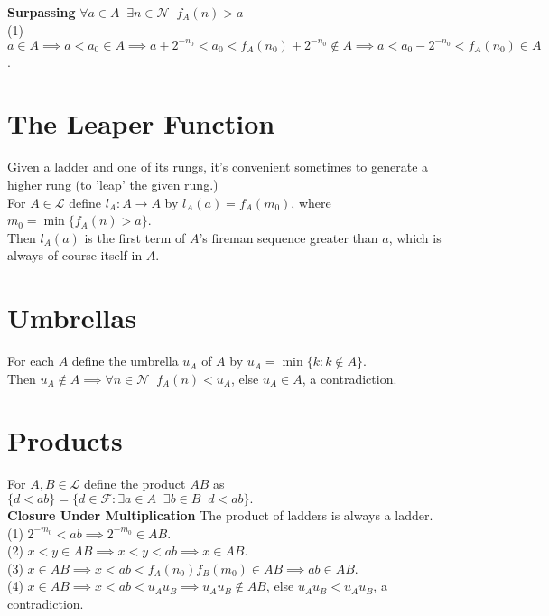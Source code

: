\documentclass[10pt]{article}
\newcommand{\ladders}{ \mathscr{L}}
\newcommand{\dyadics}{ \mathscr{F}}
\newcommand{\naturals}{ \mathscr{N}}
\newcommand{\leaper}{l}
\newcommand{\climber}{ f}
\begin{document}
\textbf{Surpassing} \;\;  $\forall a \in A \;\; \exists n \in \naturals \;\; \climber_A(n) > a$\\

(1) $a \in A\implies a < a_0 \in A \implies a + 2^{-n_0}  < a_0  < f_A(n_0) + 2^{-n_0} \notin A \implies a < a_0  - 2^{-n_0} < f_A(n_0) \in A $.\\
\bigbreak
\bigbreak
\bigbreak
\bigbreak
\bigbreak
\bigbreak
\bigbreak
\bigbreak
\bigbreak
\bigbreak
\bigbreak
\bigbreak
\bigbreak
\bigbreak
\bigbreak
\bigbreak
\bigbreak

\section{The Leaper Function}
Given a ladder and one of its rungs, it's convenient sometimes to generate a higher rung (to 'leap' the given rung.)\\

For $A \in \ladders$ define $\leaper_A : A \to A$ by $\leaper_A(a) = f_A(m_0)$, where $m_0 = \min\{f_A(n) > a \}$.\\

Then $\leaper_A(a)$ is the first term of $A$'s fireman sequence greater than $a$, which is always of course itself in $A$.

\section{Umbrellas}
For each $A$ define the umbrella $u_A$ of $A$ by $u_A= \min \{ k : k \notin A \}.$\\ 

Then $u_A \notin A \implies \forall n \in \naturals \;\; f_A(n) < u_A$, else $u_A \in A$, a contradiction.

\section{Products}

For $A, B \in \ladders$ define the product $AB$ as $\{d < ab\} = \{ d \in \dyadics : \exists a \in A \;\; \exists b \in B \;\; d < ab \}.$\\

\textbf{Closure Under Multiplication} The product of ladders is always a ladder.\\ 

(1) $2^{-m_0} < a b \implies 2^{-m_0} \in AB$.\\
(2) $ x < y \in AB \implies x < y < ab \implies x \in AB$.\\
(3) $x \in AB \implies x < ab  < \climber_A(n_0) \climber_B(m_0) \in AB \implies ab \in AB.$\\
(4) $x \in AB \implies x < ab < u_A u_B \implies u_A u_B \notin AB$, else $u_A u_B < u_A u_B$, a contradiction.\\
\end{document}
